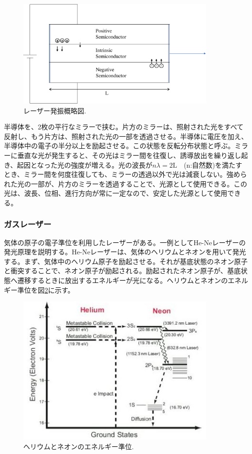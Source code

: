 \documentclass[11pt,a4j]{jsarticle}
\begin{document}
\begin{figure}[h]
 \centering
 \includegraphics[clip,width=10cm]{pin.eps}
 \caption{レーザー発振概略図.}
 \label{fig_laser1}
\end{figure}

\newpage
半導体を、2枚の平行なミラーで挟む。片方のミラーは、照射された光をすべて反射し、もう片方は、照射された光の一部を透過させる。半導体に電圧を加え、半導体中の電子の半分以上を励起させる。この状態を反転分布状態と呼ぶ。ミラーに垂直な光が発生すると、その光はミラー間を往復し、誘導放出を繰り返し起き、起因となった光の強度が増える。光の波長が$n\lambda=2\mathrm{L}$　(n:自然数)を満たすとき、ミラー間を何度往復しても、ミラーの透過以外で光は減衰しない。強められた光の一部が、片方のミラーを透過することで、光源として使用できる。この光は、波長、位相、進行方向が常に一定なので、安定した光源として使用できる。

\newpage

\newpage
\subsubsection{ガスレーザー}
気体の原子の電子準位を利用したレーザーがある。一例としてHe-Neレーザーの発光原理を説明する。He-Neレーザーは、気体のヘリウムとネオンを用いて発光する。まず、気体中のヘリウム原子を励起させる。それが基底状態のネオン原子と衝突することで、ネオン原子が励起される。励起されたネオン原子が、基底状態へ遷移するときに放出するエネルギーが光になる。ヘリウムとネオンのエネルギー準位を図\ref{fig_laser2}に示す\cite{HeNe}。

\begin{figure}[h]
 \centering
 \includegraphics[clip,width=10cm]{start_gas_laser.jpg}
 \caption{ヘリウムとネオンのエネルギー準位.}
 \label{fig_laser2}
\end{figure}
\end{document}
